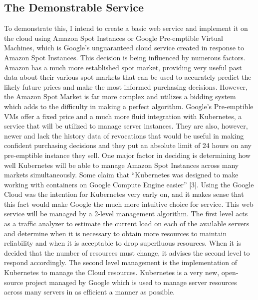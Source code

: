 \documentclass[thesis,proposal]{umassthesis}  %
\begin{document}
\subsection{The Demonstrable Service}
To demonstrate this, I intend to create a basic web service and implement it on the cloud using Amazon Spot Instances or Google Pre-emptible Virtual Machines, which is Google’s unguaranteed cloud service created in response to Amazon Spot Instances. This decision is being influenced by numerous factors. Amazon has a much more established spot market, providing very useful past data about their various spot markets that can be used to accurately predict the likely future prices and make the most informed purchasing decisions. However, the Amazon Spot Market is far more complex and utilizes a bidding system which adds to the difficulty in making a perfect algorithm. Google’s Pre-emptible VMs offer a fixed price and a much more fluid integration with Kubernetes, a service that will be utilized to manage server instances. They are also, however, newer and lack the history data of revocations that would be useful in making confident purchasing decisions and they put an absolute limit of 24 hours on any pre-emptible instance they sell. One major factor in deciding is determining how well Kubernetes will be able to manage Amazon Spot Instances across many markets simultaneously. Some claim that “Kubernetes was designed to make working with containers on Google Compute Engine easier” [3]. Using the Google Cloud was the intention for Kubernetes very early on, and it makes sense that this fact would make Google the much more intuitive choice for service. 
	This web service will be managed by a 2-level management algorithm. The first level acts as a traffic analyzer to estimate the current load on each of the available servers and determine when it is necessary to obtain more resources to maintain reliability and when it is acceptable to drop superfluous resources. When it is decided that the number of resources must change, it advises the second level to respond accordingly. The second level management is the implementation of Kubernetes to manage the Cloud resources. Kubernetes is a very new, open-source project managed by Google which is used to manage server resources across many servers in as efficient a manner as possible. 
\end{document}
